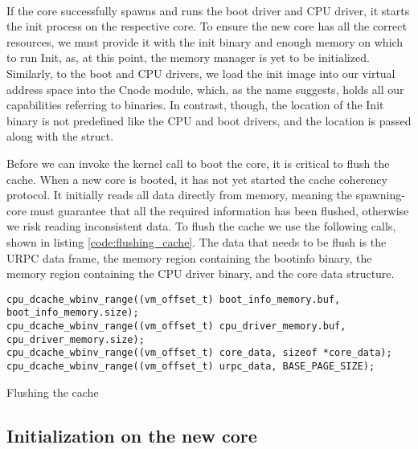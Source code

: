 \paragraph{}
If the core successfully spawns and runs the boot driver and CPU driver, it starts the init process on the respective core. To ensure the new core has all the correct resources, we must provide it with the init binary and enough memory on which to run Init, as, at this point, the memory manager is yet to be initialized. Similarly, to the boot and CPU drivers, we load the init image into our virtual address space into the Cnode module, which, as the name suggests, holds all our capabilities referring to binaries. In contrast, though, the location of the Init binary is not predefined like the CPU and boot drivers, and the location is passed along with the  struct.

Before we can invoke the kernel call to boot the core, it is critical to flush the cache. When a new core is booted, it has not yet started the cache coherency protocol. It initially reads all data directly from memory, meaning the spawning-core must guarantee that all the required information has been flushed, otherwise we risk reading inconsistent data. To flush the cache we use the following calls, shown in listing \ref{code:flushing_cache}. The data that needs to be flush is the URPC data frame, the memory region containing the bootinfo binary, the memory region containing the CPU driver binary, and the core data structure. 

\begin{code}

\begin{mdframed}[style=myframe]
\begin{verbatim}
cpu_dcache_wbinv_range((vm_offset_t) boot_info_memory.buf, boot_info_memory.size);
cpu_dcache_wbinv_range((vm_offset_t) cpu_driver_memory.buf, cpu_driver_memory.size);
cpu_dcache_wbinv_range((vm_offset_t) core_data, sizeof *core_data);
cpu_dcache_wbinv_range((vm_offset_t) urpc_data, BASE_PAGE_SIZE);
\end{verbatim}
\end{mdframed}
\caption{Flushing the cache}
\label{code:flushing_cache}
\newline
\end{code}

\subsection{Initialization on the new core}


